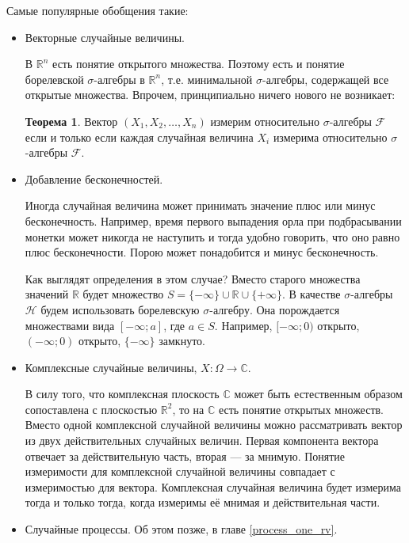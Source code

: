\documentclass[pdftex, 12pt, a4paper]{article}
\def\R{\ensuremath{\mathbb{R}}} %
\def\F{\ensuremath{\mathcal{F}}} %
\def\s{\ensuremath{\sigma}}
\renewcommand{\to}{\rightarrow}
\theoremstyle{definition} %
\newtheorem{myth}{Теорема}
\numberwithin{problem}{section}
\numberwithin{blits}{section}
\begin{document}
Самые популярные обобщения такие:

\begin{itemize}

\item Векторные случайные величины.

В $\R^{n}$ есть понятие открытого множества. Поэтому есть и понятие борелевской \s-алгебры в $\R^{n}$, т.е. минимальной \s-алгебры, содержащей все открытые множества. Впрочем, принципиально ничего нового не возникает:

\begin{myth}
Вектор $(X_{1},X_{2},\ldots , X_{n})$ измерим относительно \s-алгебры $\F$ если и только если каждая случайная величина $X_{i}$ измерима относительно \s-алгебры $\F$.
\end{myth}


%

\item Добавление бесконечностей.

Иногда случайная величина может принимать значение плюс или минус бесконечность. Например, время первого выпадения орла при подбрасывании монетки может никогда не наступить и тогда удобно говорить, что оно равно плюс бесконечности. Порою может понадобится и минус бесконечность.

Как выглядят определения в этом случае? Вместо старого множества значений $\mathbb{R}$ будет множество $S=\{-\infty\}\cup \mathbb{R}\cup\{+\infty\}$. В качестве \s-алгебры $\mathcal{H}$ будем использовать борелевскую \s-алгебру. Она порождается множествами вида $[-\infty;a]$, где $a\in S$. Например, $[-\infty;0)$ открыто, $(-\infty;0)$ открыто, $\{-\infty\}$ замкнуто.


\item Комплексные случайные величины, $X:\Omega\to\mathbb{C}$.

В силу того, что комплексная плоскость $\mathbb{C}$ может быть естественным образом сопоставлена с плоскостью $\R^{2}$, то на $\mathbb{C}$ есть понятие открытых множеств. Вместо одной комплексной случайной величины можно рассматривать вектор из двух действительных случайных величин. Первая компонента вектора отвечает за действительную часть, вторая --- за мнимую. Понятие измеримости для комплексной случайной величины совпадает с измеримостью для вектора. Комплексная случайная величина будет измерима тогда и только тогда, когда измеримы её мнимая и действительная части. 


\item Случайные процессы. Об этом позже, в главе \ref{process_one_rv}.

\end{itemize}
\end{document}
